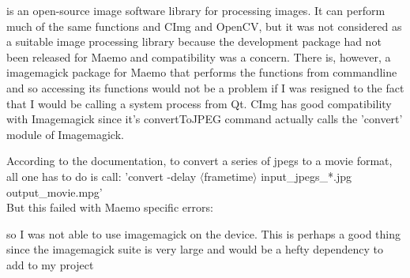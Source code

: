 {\hspace{-20pt}{\bf Imagemagick} is an open-source image software library for processing images. It can perform much of the same functions and CImg and OpenCV, but it was not considered as a suitable image processing library because the development package had not been released for Maemo and compatibility was a concern. There is, however, a imagemagick package for Maemo that performs the functions from commandline and so accessing its functions would not be a problem if I was resigned to the fact that I would be calling a system process from Qt. CImg has good compatibility with Imagemagick since it's convertToJPEG command actually calls the 'convert' module of Imagemagick.

According to the documentation, to convert a series of jpegs to a movie format, all one has to do is call:
'convert -delay \(\langle\)frametime\(\rangle\) input\_jpegs\_*.jpg output\_movie.mpg'\\
But this failed with Maemo specific errors:
\pagebreak
\vspace{-20pt}
\begin{frame}{}

\end{frame}
so I was not able to use imagemagick on the device. This is perhaps a good thing since the imagemagick suite is very large and would be a hefty dependency to add to my project\\

}
